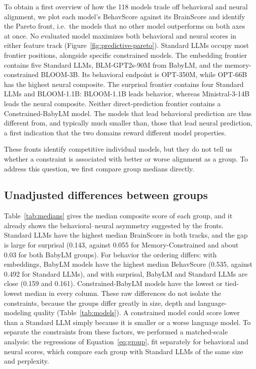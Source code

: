 To obtain a first overview of how the 118 models trade off behavioral and neural alignment, we plot each model's BehavScore against its BrainScore and identify the Pareto front, i.e.\ the models that no other model outperforms on both axes at once. No evaluated model maximizes both behavioral and neural scores in either feature track (Figure~\ref{fig:predictive-pareto}). Standard LLMs occupy most frontier positions, alongside specific constrained models. The embedding frontier contains five Standard LLMs, BLM-GPT2s-90M from BabyLM, and the memory-constrained BLOOM-3B. Its behavioral endpoint is OPT-350M, while OPT-66B has the highest neural composite. The surprisal frontier contains four Standard LLMs and BLOOM-1.1B: BLOOM-1.1B leads behavior, whereas Ministral-3-14B leads the neural composite. Neither direct-prediction frontier contains a Constrained-BabyLM model. The models that lead behavioral prediction are thus different from, and typically much smaller than, those that lead neural prediction, a first indication that the two domains reward different model properties.

These fronts identify competitive individual models, but they do not tell us whether a constraint is associated with better or worse alignment as a group. To address this question, we first compare group medians directly.

\subsection{Unadjusted differences between groups}
\label{sec:results-raw}



Table~\ref{tab:medians} gives the median composite score of each group, and it already shows the behavioral--neural asymmetry suggested by the fronts. Standard LLMs have the highest median BrainScore in both tracks, and the gap is large for surprisal (0.143, against 0.055 for Memory-Constrained and about 0.03 for both BabyLM groups). For behavior the ordering differs: with embeddings, BabyLM models have the highest median BehavScore (0.535, against 0.492 for Standard LLMs), and with surprisal, BabyLM and Standard LLMs are close (0.159 and 0.161). Constrained-BabyLM models have the lowest or tied-lowest median in every column. These raw differences do not isolate the constraints, because the groups differ greatly in size, depth and language-modeling quality (Table~\ref{tab:models}). A constrained model could score lower than a Standard LLM simply because it is smaller or a worse language model. To separate the constraints from these factors, we performed a matched-scale analysis: the regressions of Equation~\ref{eq:group}, fit separately for behavioral and neural scores, which compare each group with Standard LLMs of the same size and perplexity.

